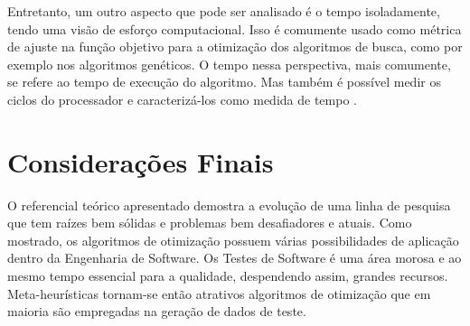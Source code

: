 Entretanto, um outro aspecto que pode ser analisado é o tempo isoladamente, tendo uma visão de esforço computacional. Isso é comumente usado como métrica de ajuste na função objetivo para a otimização dos algoritmos de busca, como por exemplo nos algoritmos genéticos. O tempo nessa perspectiva, mais comumente, se refere ao tempo de execução do algoritmo. Mas também é possível medir os ciclos do processador e caracterizá-los como medida de tempo \cite{rodrigues2018using}.

\section{Considerações Finais \label{sec:considFinRefTeor}}

O referencial teórico apresentado demostra a evolução de uma linha de pesquisa que tem raízes bem sólidas e problemas bem desafiadores e atuais. Como mostrado, os algoritmos de otimização possuem várias possibilidades de aplicação dentro da Engenharia de Software. Os Testes de Software é uma área morosa e ao mesmo tempo essencial para a qualidade, despendendo assim, grandes recursos. Meta-heurísticas tornam-se então atrativos algoritmos de otimização que em maioria são empregadas na geração de dados de teste.


